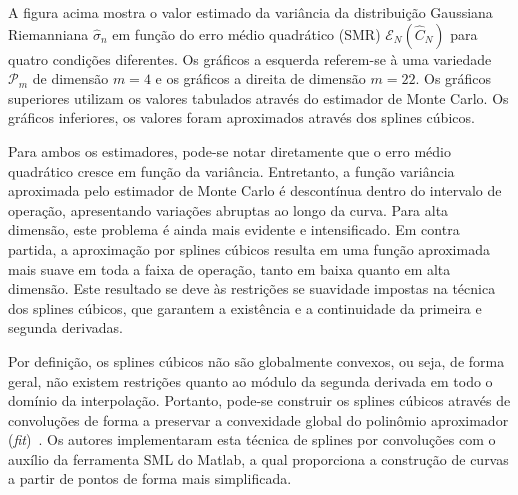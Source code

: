 \documentclass[a4paper,titlepage]{article}
\begin{document}
A figura acima mostra o valor estimado da variância da distribuição Gaussiana
Riemanniana $\hat{\sigma}_n$ em função do erro médio quadrático (SMR)
$\mathcal{E}_N(\hat{C}_N)$ para quatro condições diferentes. Os gráficos a
esquerda referem-se à uma variedade $\mathcal{P}_m$ de dimensão $m=4$ e os
gráficos a direita de dimensão $m=22$. Os gráficos superiores utilizam os
valores tabulados através do estimador de Monte Carlo. Os gráficos inferiores,
os valores foram aproximados através dos splines cúbicos.

Para ambos os estimadores, pode-se notar diretamente que o erro médio
quadrático cresce em função da variância. Entretanto, a função variância
aproximada pelo estimador de Monte Carlo é descontínua dentro do intervalo de
operação, apresentando variações abruptas ao longo da curva. Para alta
dimensão, este problema é ainda mais evidente e intensificado. Em contra
partida, a aproximação por splines cúbicos resulta em uma função aproximada
mais suave em toda a faixa de operação, tanto em baixa quanto em alta dimensão.
Este resultado se deve às restrições se suavidade impostas na técnica dos
splines cúbicos, que garantem a existência e a continuidade da primeira e
segunda derivadas.  

\begin{center}
  \vspace{1em}
  \vspace{1em}
\end{center}

Por definição, os splines cúbicos não são globalmente convexos, ou seja,
de forma geral, não existem restrições quanto ao módulo da segunda derivada
em todo o domínio da interpolação. Portanto, pode-se construir os splines
cúbicos através de convoluções de forma a preservar a convexidade global
do polinômio aproximador (\textit{fit})~\cite{convexsplines}. Os autores
implementaram esta técnica de splines por convoluções com o auxílio da
ferramenta SML do Matlab\cite{d2009slm}, a qual proporciona a construção de
curvas a partir de pontos de forma mais simplificada.
\end{document}

